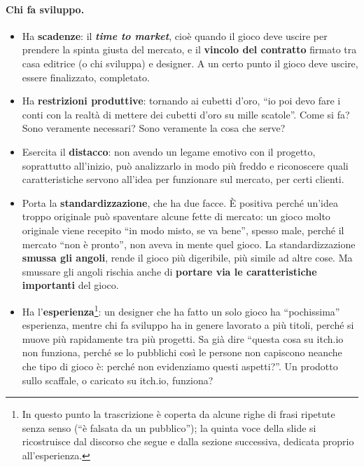 \paragraph{Chi fa sviluppo.}
\begin{itemize}
  \item Ha \textbf{scadenze}: il \textbf{\emph{time to market}}, cioè quando il gioco deve
        uscire per prendere la spinta giusta del mercato, e il \textbf{vincolo del
        contratto} firmato tra casa editrice (o chi sviluppa) e designer. A un certo punto
        il gioco deve uscire, essere finalizzato, completato.
  \item Ha \textbf{restrizioni produttive}: tornando ai cubetti d'oro, ``io poi devo fare i
        conti con la realtà di mettere dei cubetti d'oro su mille scatole''. Come si fa?
        Sono veramente necessari? Sono veramente la cosa che serve?
  \item Esercita il \textbf{distacco}: non avendo un legame emotivo con il progetto,
        soprattutto all'inizio, può analizzarlo in modo più freddo e riconoscere quali
        caratteristiche servono all'idea per funzionare sul mercato, per certi clienti.
  \item Porta la \textbf{standardizzazione}, che ha due facce. È positiva perché un'idea
        troppo originale può spaventare alcune fette di mercato: un gioco molto originale
        viene recepito ``in modo misto, se va bene'', spesso male, perché il mercato ``non
        è pronto'', non aveva in mente quel gioco. La standardizzazione \textbf{smussa gli
        angoli}, rende il gioco più digeribile, più simile ad altre cose. Ma smussare gli
        angoli rischia anche di \textbf{portare via le caratteristiche importanti} del
        gioco.
  \item Ha l'\textbf{esperienza}\footnote{In questo punto la trascrizione è coperta da
        alcune righe di frasi ripetute senza senso (``è falsata da un pubblico''); la
        quinta voce della slide si ricostruisce dal discorso che segue e dalla sezione
        successiva, dedicata proprio all'esperienza.}: un designer che ha fatto un solo
        gioco ha ``pochissima'' esperienza, mentre chi fa sviluppo ha in genere lavorato a
        più titoli, perché si muove più rapidamente tra più progetti. Sa già dire ``questa
        cosa su itch.io non funziona, perché se lo pubblichi così le persone non capiscono
        neanche che tipo di gioco è: perché non evidenziamo questi aspetti?''. Un prodotto
        sullo scaffale, o caricato su itch.io, funziona?
\end{itemize}

